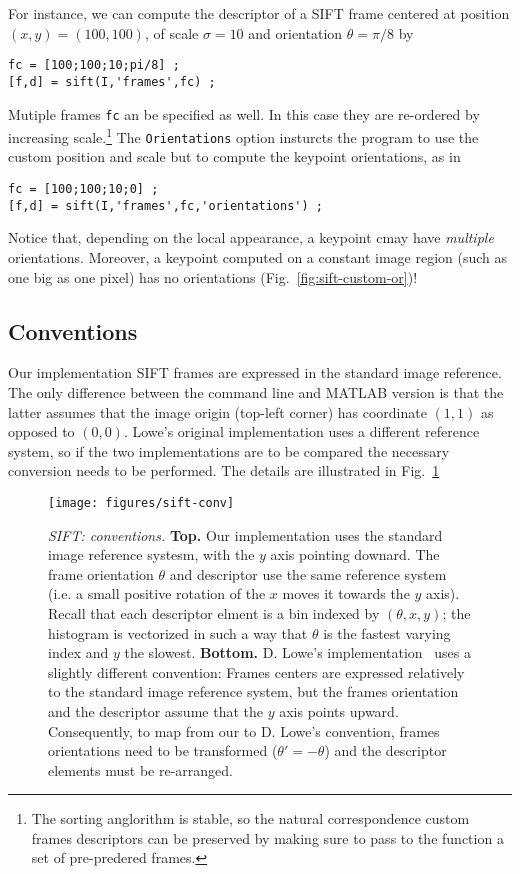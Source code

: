 \documentclass[9.5pt]{article}
\newcommand{\param}[1]{{\color{red}\tt   #1}}
\begin{document}
For instance, we can compute the descriptor of a SIFT frame centered
at position $(x,y)=(100,100)$, of scale $\sigma=10$ and orientation
$\theta=\pi/8$ by
\begin{verbatim}
fc = [100;100;10;pi/8] ;
[f,d] = sift(I,'frames',fc) ;
\end{verbatim}
Mutiple frames \verb$fc$ an be specified as well. In this case they
are re-ordered by increasing scale.\footnote{The sorting anglorithm is
  stable, so the natural correspondence custom frames descriptors can
  be preserved by making sure to pass to the function a set of
  pre-predered frames.} The \param{Orientations} option insturcts the
program to use the custom position and scale but to compute the
keypoint orientations, as in
\begin{verbatim}
fc = [100;100;10;0] ;
[f,d] = sift(I,'frames',fc,'orientations') ;
\end{verbatim}
Notice that, depending on the local appearance, a keypoint cmay have
{\em multiple} orientations.  Moreover, a keypoint computed on a
constant image region (such as one big as one pixel) has no
orientations (Fig.~\ref{fig:sift-custom-or})!

\subsection{Conventions}\label{sift.conventions}

Our implementation SIFT frames are expressed in the standard image
reference.  The only difference between the command line and MATLAB
version is that the latter assumes that the image origin (top-left
corner) has coordinate $(1,1)$ as opposed to $(0,0)$. Lowe's original
implementation uses a different reference system, so if the two
implementations are to be compared the necessary conversion needs to
be performed.  The details are illustrated in Fig.~\ref{fig:sift-conv}

\begin{figure}
\begin{center}
\texttt{[image: figures/sift-conv]}
\end{center}
\caption{{\em SIFT: conventions.} {\bf Top.} Our implementation uses
  the standard image reference systesm, with the $y$ axis pointing
  downard. The frame orientation $\theta$ and descriptor use the same
  reference system (i.e. a small positive rotation of the $x$ moves it
  towards the $y$ axis). Recall that each descriptor elment is a bin
  indexed by $(\theta,x,y)$; the histogram is vectorized in such a way
  that $\theta$ is the fastest varying index and $y$ the slowest. {\bf
    Bottom.} D. Lowe's implementation~\cite{lowe07sift} uses a
  slightly different convention: Frames centers are expressed
  relatively to the standard image reference system, but the frames
  orientation and the descriptor assume that the $y$ axis points
  upward. Consequently, to map from our to D. Lowe's convention,
  frames orientations need to be transformed ($\theta'=-\theta$) and
  the descriptor elements must be re-arranged.}
\label{fig:sift-conv}
\end{figure}
\end{document}
